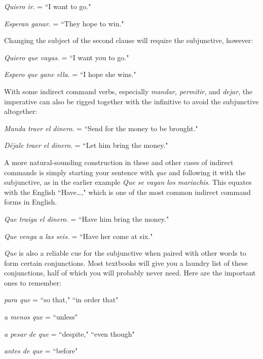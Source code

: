 \bsk

\indu \emph{Quiero ir}. = ``I want to go."

\indu \emph{Esperan ganar}. = ``They hope to win."

\bsk

Changing the subject of the second clause will require the subjunctive,
however:

\bsk

\indu \emph{Quiero que vayas}. = ``I want you to go."

\indu \emph{Espero que gane ella}. = ``I hope she wins."

\bsk

With some indirect command verbs, especially \emph{mandar, permitir}, and \emph{dejar}, the imperative can also be rigged together with the
infinitive to avoid the subjunctive altogether:

\bsk

\indu \emph{Manda traer el dinero}. = ``Send for the money to be brought."

\indu \emph{Déjale traer el dinero}. = ``Let him bring the money."

\bsk

A more natural-sounding construction in these and other cases of indirect commands is simply starting your sentence with \emph{que} and following it with the subjunctive, as in the earlier example \emph{Que se vayan los
	mariachis}. This equates with the English ``Have\ldots{}," which is one of
the most common indirect command forms in English.

\bsk

\indu \emph{Que traiga el dinero}. = ``Have him bring the money."

\indu \emph{Que venga a las seis}. = ``Have her come at six."

\bsk

\emph{Que} is also a reliable cue for the subjunctive when paired with
other words to form certain conjunctions. Most textbooks will give
you a laundry list of these conjunctions, half of which you will probably never need. Here are the important ones to remember:

\bsk

\indu \emph{para que} = ``so that," ``in order that"

\indu \emph{a menos que} = ``unless"

\indu \emph{a pesar de que} = ``despite," ``even though"

\indu \emph{antes de que} = ``before"

